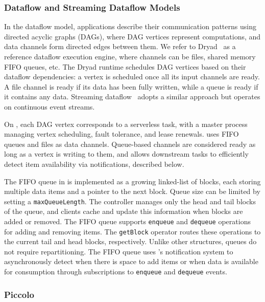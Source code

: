 \subsubsection{Dataflow and Streaming Dataflow Models}
\label{sssec:dflow}

In the dataflow model, applications describe their communication patterns using directed acyclic graphs (DAGs), where DAG vertices represent computations, and data channels form directed edges between them. We refer to Dryad~\cite{dryad} as a reference dataflow execution engine, where channels can be files, shared memory FIFO queues, etc. The Dryad runtime schedules DAG vertices based on their dataflow dependencies: a vertex is scheduled once all its input channels are ready. A file channel is ready if its data has been fully written, while a queue is ready if it contains any data. Streaming dataflow~\cite{streamscope} adopts a similar approach but operates on continuous event streams.

On \jiffy, each DAG vertex corresponds to a serverless task, with a master process managing vertex scheduling, fault tolerance, and lease renewals. \jiffy uses FIFO queues and files as data channels. Queue-based channels are considered ready as long as a vertex is writing to them, and \jiffy allows downstream tasks to efficiently detect item availability via notifications, described below.

 The FIFO queue in \jiffy is implemented as a growing linked-list of blocks, each storing multiple data items and a pointer to the next block. Queue size can be limited by setting a \texttt{maxQueueLength}. The controller manages only the head and tail blocks of the queue, and clients cache and update this information when blocks are added or removed. The FIFO queue supports \texttt{enqueue} and \texttt{dequeue} operations for adding and removing items. The \texttt{getBlock} operator routes these operations to the current tail and head blocks, respectively. Unlike other structures, queues do not require repartitioning. The FIFO queue uses \jiffy’s notification system to asynchronously detect when there is space to add items or when data is available for consumption through subscriptions to \texttt{enqueue} and \texttt{dequeue} events.

\subsubsection{Piccolo}
\label{sssec:piccolo}

